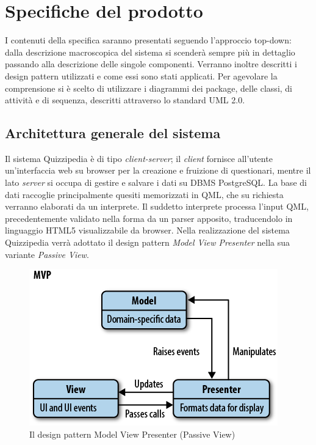\documentclass[a4paper,11pt]{article}
\begin{document}
	\section{Specifiche del prodotto}
	I contenuti della specifica saranno presentati seguendo l'approccio top-down: dalla descrizione macroscopica del sistema si scenderà sempre più in dettaglio passando alla descrizione delle singole componenti. Verranno inoltre descritti i design pattern utilizzati e come essi sono stati applicati. Per agevolare la comprensione si è scelto di utilizzare i diagrammi dei package, delle classi, di attività e di sequenza, descritti attraverso lo standard UML 2.0.
	
	\subsection{Architettura generale del sistema}
	Il sistema Quizzipedia è di tipo \emph{client-server}; il \emph{client} fornisce all'utente un'interfaccia web su browser per la creazione e fruizione di questionari, mentre il lato \emph{server} si occupa di gestire e salvare i dati su DBMS PostgreSQL. La base di dati raccoglie principalmente quesiti memorizzati in QML, che su richiesta verranno elaborati da un interprete.
Il suddetto interprete processa l'input QML, precedentemente validato nella forma da un parser apposito, traducendolo in linguaggio HTML5 visualizzabile da browser.
Nella realizzazione del sistema Quizzipedia verrà adottato il design pattern \emph{Model View Presenter} nella sua variante \emph{Passive View}.
\begin{figure}[h!]
\begin{center}
	\includegraphics[scale=1.3]{../images/mvp.png}
	\caption{Il design pattern Model View Presenter (Passive View)}
\end{center}
\end{figure}
\end{document}
